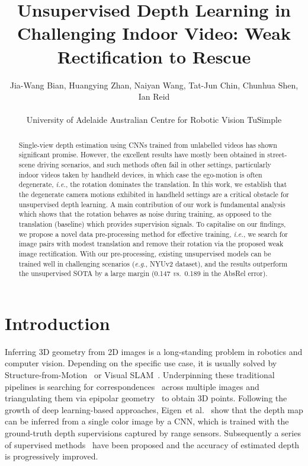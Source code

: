 \documentclass{article}
\title{Unsupervised Depth Learning in Challenging Indoor Video: Weak Rectification to Rescue}
\author{Jia-Wang Bian, Huangying Zhan, Naiyan Wang, \And Tat-Jun Chin, Chunhua Shen, Ian Reid \\ \\
  University of Adelaide \quad Australian Centre for Robotic Vision \quad TuSimple \\
}
\def\eg{\emph{e.g.}}
\def\ie{\emph{i.e.}}
\def\etal{et al.}
\def\vs{\emph{vs.}}
\begin{document}
\maketitle

\begin{abstract}

Single-view depth estimation using CNNs trained from unlabelled videos has shown significant promise. 
However, the excellent results have mostly been obtained in street-scene driving scenarios, 
and such methods often fail in other settings,
particularly indoor videos taken by handheld devices,
in which case the ego-motion is often degenerate, \ie, the rotation dominates the translation.
In this work, we establish that the degenerate camera motions exhibited in handheld settings are a critical obstacle for unsupervised depth learning.
A main contribution of our work is fundamental analysis which shows that the rotation behaves as noise during training, 
as opposed to the translation (baseline) which provides supervision signals.
To capitalise on our findings, we propose a novel data pre-processing method for effective training, \ie, we search for image pairs with modest translation and remove their rotation via the proposed weak image rectification.
With our pre-processing, existing unsupervised models can be trained well in challenging scenarios (\eg, NYUv2 dataset), 
and the results outperform the unsupervised SOTA by a large margin (0.147 \vs\  0.189 in the AbsRel error).

\end{abstract}

\section{Introduction}
\label{sec:intro}

Inferring 3D geometry from 2D images is a long-standing problem in robotics and computer vision.
Depending on the specific use case, it is usually solved by Structure-from-Motion~\cite{schonberger2016structure} or Visual SLAM~\cite{davison2007monoslam, newcombe2011dtam, mur2015orb}.
Underpinning these traditional pipelines is searching for correspondences~\cite{lowe2004distinctive,Bian2019Gms} across multiple images and triangulating them via epipolar geometry~\cite{Zhang1998,hartley2003multiple,bian2019bench} to obtain 3D points.
Following the growth of deep learning-based approaches, 
Eigen~\etal~\cite{eigen2014depth} show that the depth map can be inferred from a single color image by a CNN,
which is trained with the ground-truth depth supervisions captured by range sensors. 
Subsequently a series of supervised methods~\cite{liu2016learning, eigen2015predicting, chakrabarti2016depth, laina2016deeper, li2017two, fu2018deep, Yin2019enforcing} have been proposed and the accuracy of estimated depth is progressively improved.
\end{document}
